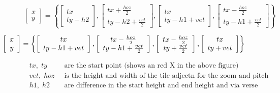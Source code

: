 \begin{equation}
\; \left[ \begin{array}{c} x \\ y \end{array} \right]=\left\{ \left[ \begin{array}{c} tx \\ ty-h2 \end{array} \right],\left[ \begin{array}{c} tx+\frac{hoz}{2} \\ ty-h2+\frac{vet}{2} \end{array} \right],\left[ \begin{array}{c} tx \\ ty-h1+vet \end{array} \right],\left[ \begin{array}{c} tx-\frac{hoz}{2} \\ ty-h1+\frac{vet}{2} \end{array} \right]\right\}
\end{equation}

\begin{equation}
\hspace{-2.5cm} \left[ \begin{array}{c} x \\ y \end{array} \right]=\left\{ \left[ \begin{array}{c} tx \\ ty-h1+vet \end{array} \right],\left[ \begin{array}{c} tx-\frac{hoz}{2} \\ ty-h1+\frac{vet}{2} \end{array} \right],\left[ \begin{array}{c} tx-\frac{hoz}{2} \\ ty+\frac{vet}{2} \end{array} \right],\left[ \begin{array}{c} tx \\ ty+vet \end{array} \right] \right\}
\end{equation}

\begin{align*}
	tx,\; ty   &\;\; \textrm{are the start point (shows an red X in the above figure)}\\
	vet,\; hoz &\;\; \textrm{is the height and width of the tile adjectn for  the zoom and pitch}\\
	h1,\; h2   &\;\; \textrm{are difference in the start height and end height and via verse}
\end{align*}

